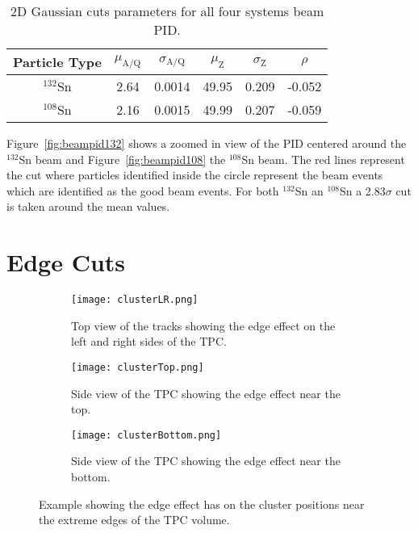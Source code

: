 \begin{table}[!htb]
  \begin{center}
    \begin{tabular}{cccccc}
      \hline 
      Particle Type & $\mu_\mathrm{A/Q}$ & $\sigma_\mathrm{A/Q}$ & $\mu_\mathrm{Z}$ &
      $\sigma_\mathrm{Z}$ & $\rho$\\
      \hline\hline 
      ${}^{132}$Sn & 2.64 & 0.0014 & 49.95 & 0.209 & -0.052 \\
      ${}^{108}$Sn & 2.16 & 0.0015 & 49.99 & 0.207 & -0.059 \\
      \hline
    \end{tabular}
    \caption{2D Gaussian cuts parameters for all four systems beam PID.
    \label{beamParameters}}
  \end{center}
\end{table}

Figure~\ref{fig:beampid132} shows a zoomed in view of the PID centered around the ${}^{132}$Sn beam and Figure~\ref{fig:beampid108} the ${}^{108}$Sn beam. The red lines represent the cut where particles identified inside the circle represent the beam events which are identified as the good beam events. For both ${}^{132}$Sn an ${}^{108}$Sn a 2.83$\sigma$ cut is taken around the mean values.  


\section{Edge Cuts}

\begin{figure}[!htb]

    \centering
    \begin{subfigure}[t]{0.45\textwidth}
        \centering
        \texttt{[image: clusterLR.png]} 
        \caption{Top view of the tracks showing the edge effect on the left and right sides of the TPC.} 	   \label{fig:clusterLR}
    \end{subfigure}
    \hfill
    \begin{subfigure}[t]{0.45\textwidth}
        \centering
        \texttt{[image: clusterTop.png]} 
        \caption{Side view of the TPC showing the edge effect near the top.} \label{fig:clusterTop}
    \end{subfigure}
    
    \begin{subfigure}[t]{0.45\textwidth}
        \centering
        \texttt{[image: clusterBottom.png]} 
        \caption{Side view of the TPC showing the edge effect near the bottom.} \label{fig:clusterBottom}
    \end{subfigure}
\caption{Example showing the edge effect has on the cluster positions near the extreme edges of the TPC volume. }    
\label{fig:edge}
\end{figure}


